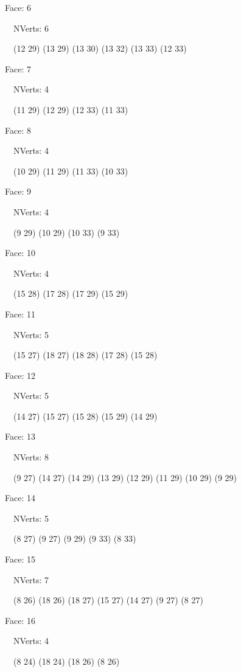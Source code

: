 \documentclass{article}
\begin{document}
{\footnotesize 

Face: 6

\   \    NVerts: 6

 \   \   (12 29) (13 29) (13 30) (13 32) (13 33) (12 33)}

{\footnotesize 

Face: 7

\   \    NVerts: 4

 \   \   (11 29) (12 29) (12 33) (11 33)}

{\footnotesize 

Face: 8

\   \    NVerts: 4

 \   \   (10 29) (11 29) (11 33) (10 33)}

{\footnotesize 

Face: 9

\   \    NVerts: 4

 \   \   (9 29) (10 29) (10 33) (9 33)}

{\footnotesize 

Face: 10

\   \    NVerts: 4

 \   \   (15 28) (17 28) (17 29) (15 29)}

{\footnotesize 

Face: 11

\   \    NVerts: 5

 \   \   (15 27) (18 27) (18 28) (17 28) (15 28)}

{\footnotesize 

Face: 12

\   \    NVerts: 5

 \   \   (14 27) (15 27) (15 28) (15 29) (14 29)}

{\footnotesize 

Face: 13

\   \    NVerts: 8

 \   \   (9 27) (14 27) (14 29) (13 29) (12 29) (11 29) (10 29) (9 29)}

{\footnotesize 

Face: 14

\   \    NVerts: 5

 \   \   (8 27) (9 27) (9 29) (9 33) (8 33)}

{\footnotesize 

Face: 15

\   \    NVerts: 7

 \   \   (8 26) (18 26) (18 27) (15 27) (14 27) (9 27) (8 27)}

{\footnotesize 

Face: 16

\   \    NVerts: 4

 \   \   (8 24) (18 24) (18 26) (8 26)}
\end{document}
